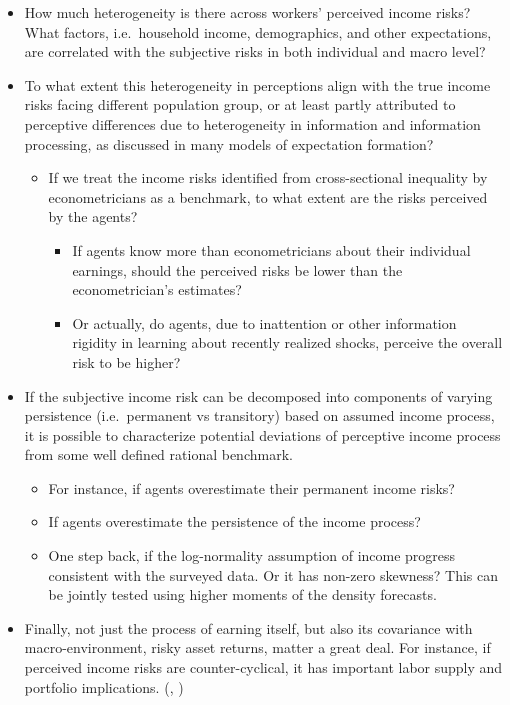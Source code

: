 \documentclass[12pt,notitlepage,onecolumn,aps,pra]{article}
\providecommand{\tightlist}{%
      \setlength{\itemsep}{0pt}\setlength{\parskip}{0pt}}
\begin{document}
\begin{itemize}
\item
  How much heterogeneity is there across workers' perceived income
  risks? What factors, i.e.~household income, demographics, and other
  expectations, are correlated with the subjective risks in both
  individual and macro level?
\item
  To what extent this heterogeneity in perceptions align with the true
  income risks facing different population group, or at least partly
  attributed to perceptive differences due to heterogeneity in
  information and information processing, as discussed in many models of
  expectation formation?

  \begin{itemize}
  \tightlist
  \item
    If we treat the income risks identified from cross-sectional
    inequality by econometricians as a benchmark, to what extent are the
    risks perceived by the agents?

    \begin{itemize}
    \tightlist
    \item
      If agents know more than econometricians about their individual
      earnings, should the perceived risks be lower than the
      econometrician's estimates?
    \item
      Or actually, do agents, due to inattention or other information
      rigidity in learning about recently realized shocks, perceive the
      overall risk to be higher?
    \end{itemize}
  \end{itemize}
\item
  If the subjective income risk can be decomposed into components of
  varying persistence (i.e.~permanent vs transitory) based on assumed
  income process, it is possible to characterize potential deviations of
  perceptive income process from some well defined rational benchmark.

  \begin{itemize}
  \tightlist
  \item
    For instance, if agents overestimate their permanent income risks?
  \item
    If agents overestimate the persistence of the income process?
    \cite{rozsypal_overpersistence_2017}
  \item
    One step back, if the log-normality assumption of income progress
    consistent with the surveyed data. Or it has non-zero skewness? This
    can be jointly tested using higher moments of the density forecasts.
  \end{itemize}
\item
  Finally, not just the process of earning itself, but also its
  covariance with macro-environment, risky asset returns, matter a great
  deal. For instance, if perceived income risks are counter-cyclical, it
  has important labor supply and portfolio implications.
  (\cite{guvenen2014nature}, \cite{catherine_countercyclical_2019})
\end{itemize}
\end{document}
